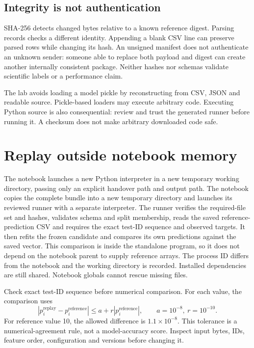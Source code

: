 \subsection{Integrity is not authentication}
SHA-256 detects changed bytes relative to a known reference digest. Parsing records checks a different identity. Appending a blank CSV line can preserve parsed rows while changing its hash. An unsigned manifest does not authenticate an unknown sender: someone able to replace both payload and digest can create another internally consistent package. Neither hashes nor schemas validate scientific labels or a performance claim.

The lab avoids loading a model pickle by reconstructing from CSV, JSON and readable source. Pickle-based loaders may execute arbitrary code. Executing Python source is also consequential: review and trust the generated runner before running it. A checksum does not make arbitrary downloaded code safe.

\section{Replay outside notebook memory}
The notebook launches a new Python interpreter in a new temporary working directory, passing only an explicit handover path and output path. The notebook copies the complete bundle into a new temporary directory and launches its reviewed runner with a separate interpreter. The runner verifies the required-file set and hashes, validates schema and split membership, reads the saved reference-prediction CSV and requires the exact test-ID sequence and observed targets. It then refits the frozen candidate and compares its own predictions against the saved vector. This comparison is inside the standalone program, so it does not depend on the notebook parent to supply reference arrays. The process ID differs from the notebook and the working directory is recorded. Installed dependencies are still shared. Notebook globals cannot rescue missing files.

Check exact test-ID sequence before numerical comparison. For each value, the comparison uses
\[
 |p_i^{\mathrm{replay}}-p_i^{\mathrm{reference}}|
 \leq a+r|p_i^{\mathrm{reference}}|,\qquad a=10^{-8},\ r=10^{-10}.
\]
For reference value 10, the allowed difference is $1.1\times10^{-8}$. This tolerance is a numerical-agreement rule, not a model-accuracy score. Inspect input bytes, IDs, feature order, configuration and versions before changing it.

